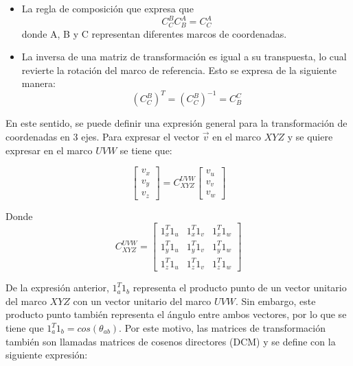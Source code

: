 \begin{itemize}
	
	\item La regla de composición que expresa que 
	\begin{equation}
		C_{C}^{B} C_{B}^{A} = C_{C}^{A}\label{eq:transformada1}
	\end{equation}
	donde A, B y C representan diferentes marcos de coordenadas.
	
	\item La inversa de una matriz de transformación es igual a su transpuesta, lo cual revierte la rotación del marco de referencia. Esto se expresa de la siguiente manera:
		\begin{equation}
			 \left(C_{C}^{B}\right)^T = \left(C_{C}^{B}\right)^{-1} = C_{B}^{C}\label{eq:transformada2}
		\end{equation}
		
\end{itemize}

En este sentido, se puede definir una expresión general para la transformación de coordenadas en 3 ejes. Para expresar el vector $\vec{v}$ en el marco $XYZ$ y se quiere expresar en el marco $UVW$ se tiene que:

$$
\left[\begin{array}{c}
	v_x\\
	v_y\\
	v_z
\end{array}\right] = 
C_{XYZ}^{UVW}
\left[\begin{array}{c}
	v_u\\
	v_v\\
	v_w
\end{array}\right]
$$

Donde
$$
C_{XYZ}^{UVW} = \left[\begin{array}{ccc}
	1_x^{T}1_u & 1_x^{T}1_v & 1_x^{T}1_w\\
	1_y^{T}1_u & 1_y^{T}1_v & 1_y^{T}1_w\\
	1_z^{T}1_u & 1_z^{T}1_v & 1_z^{T}1_w
\end{array}\right]
$$

De la expresión anterior, $1_{a}^{T}1_b$ representa el producto punto de un vector unitario del marco $XYZ$ con un vector unitario del marco $UVW$. Sin embargo, este producto punto también representa el ángulo entre ambos vectores, por lo que se tiene que $1_a^{T}1_b = cos\left(\theta_{ab}\right)$. Por este motivo, las matrices de transformación también son llamadas matrices de cosenos directores (DCM) y se define con la siguiente expresión:

